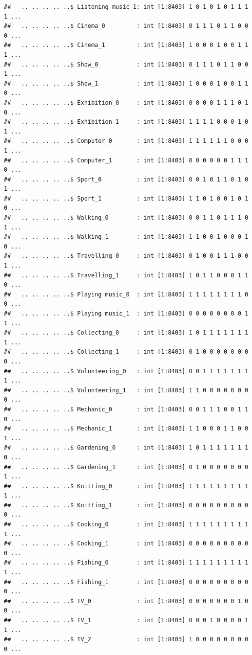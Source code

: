 \documentclass[]{book}
\begin{document}
\begin{verbatim}
##   .. .. .. .. ..$ Listening music_1: int [1:8403] 1 0 1 0 1 0 1 1 1 1 ...
##   .. .. .. .. ..$ Cinema_0         : int [1:8403] 0 1 1 1 0 1 1 0 0 0 ...
##   .. .. .. .. ..$ Cinema_1         : int [1:8403] 1 0 0 0 1 0 0 1 1 1 ...
##   .. .. .. .. ..$ Show_0           : int [1:8403] 0 1 1 1 0 1 1 0 0 1 ...
##   .. .. .. .. ..$ Show_1           : int [1:8403] 1 0 0 0 1 0 0 1 1 0 ...
##   .. .. .. .. ..$ Exhibition_0     : int [1:8403] 0 0 0 0 1 1 1 0 1 0 ...
##   .. .. .. .. ..$ Exhibition_1     : int [1:8403] 1 1 1 1 0 0 0 1 0 1 ...
##   .. .. .. .. ..$ Computer_0       : int [1:8403] 1 1 1 1 1 1 0 0 0 1 ...
##   .. .. .. .. ..$ Computer_1       : int [1:8403] 0 0 0 0 0 0 1 1 1 0 ...
##   .. .. .. .. ..$ Sport_0          : int [1:8403] 0 0 1 0 1 1 0 1 0 1 ...
##   .. .. .. .. ..$ Sport_1          : int [1:8403] 1 1 0 1 0 0 1 0 1 0 ...
##   .. .. .. .. ..$ Walking_0        : int [1:8403] 0 0 1 1 0 1 1 1 0 1 ...
##   .. .. .. .. ..$ Walking_1        : int [1:8403] 1 1 0 0 1 0 0 0 1 0 ...
##   .. .. .. .. ..$ Travelling_0     : int [1:8403] 0 1 0 0 1 1 1 0 0 1 ...
##   .. .. .. .. ..$ Travelling_1     : int [1:8403] 1 0 1 1 0 0 0 1 1 0 ...
##   .. .. .. .. ..$ Playing music_0  : int [1:8403] 1 1 1 1 1 1 1 1 0 0 ...
##   .. .. .. .. ..$ Playing music_1  : int [1:8403] 0 0 0 0 0 0 0 0 1 1 ...
##   .. .. .. .. ..$ Collecting_0     : int [1:8403] 1 0 1 1 1 1 1 1 1 1 ...
##   .. .. .. .. ..$ Collecting_1     : int [1:8403] 0 1 0 0 0 0 0 0 0 0 ...
##   .. .. .. .. ..$ Volunteering_0   : int [1:8403] 0 0 1 1 1 1 1 1 1 1 ...
##   .. .. .. .. ..$ Volunteering_1   : int [1:8403] 1 1 0 0 0 0 0 0 0 0 ...
##   .. .. .. .. ..$ Mechanic_0       : int [1:8403] 0 0 1 1 1 0 0 1 1 0 ...
##   .. .. .. .. ..$ Mechanic_1       : int [1:8403] 1 1 0 0 0 1 1 0 0 1 ...
##   .. .. .. .. ..$ Gardening_0      : int [1:8403] 1 0 1 1 1 1 1 1 1 0 ...
##   .. .. .. .. ..$ Gardening_1      : int [1:8403] 0 1 0 0 0 0 0 0 0 1 ...
##   .. .. .. .. ..$ Knitting_0       : int [1:8403] 1 1 1 1 1 1 1 1 1 1 ...
##   .. .. .. .. ..$ Knitting_1       : int [1:8403] 0 0 0 0 0 0 0 0 0 0 ...
##   .. .. .. .. ..$ Cooking_0        : int [1:8403] 1 1 1 1 1 1 1 1 1 1 ...
##   .. .. .. .. ..$ Cooking_1        : int [1:8403] 0 0 0 0 0 0 0 0 0 0 ...
##   .. .. .. .. ..$ Fishing_0        : int [1:8403] 1 1 1 1 1 1 1 1 1 1 ...
##   .. .. .. .. ..$ Fishing_1        : int [1:8403] 0 0 0 0 0 0 0 0 0 0 ...
##   .. .. .. .. ..$ TV_0             : int [1:8403] 0 0 0 0 0 0 0 1 0 0 ...
##   .. .. .. .. ..$ TV_1             : int [1:8403] 0 0 0 1 0 0 0 0 1 1 ...
##   .. .. .. .. ..$ TV_2             : int [1:8403] 1 0 0 0 0 0 0 0 0 0 ...

\end{verbatim}
\end{document}
